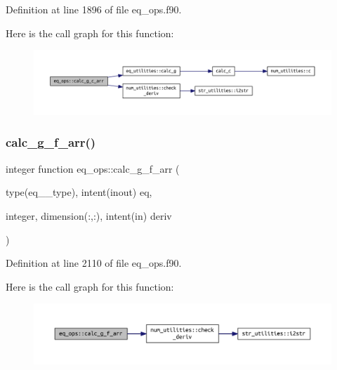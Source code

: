 Definition at line 1896 of file eq\+\_\+ops.\+f90.

Here is the call graph for this function\+:
\nopagebreak
\begin{figure}[H]
\begin{center}
\leavevmode
\includegraphics[width=350pt]{namespaceeq__ops_a7f4a16387d43c37a1dfa78eb4f91d4e4_cgraph}
\end{center}
\end{figure}
\mbox{\label{namespaceeq__ops_a29e2bd79210505601bdb37566a503e2a}} 
\subsubsection{\texorpdfstring{calc\+\_\+g\+\_\+f\+\_\+arr()}{calc\_g\_f\_arr()}}
{\footnotesize\ttfamily integer function eq\+\_\+ops\+::calc\+\_\+g\+\_\+f\+\_\+arr (\begin{DoxyParamCaption}\item[{type(eq\+\_\+2\+\_\+type), intent(inout)}]{eq,  }\item[{integer, dimension(\+:,\+:), intent(in)}]{deriv }\end{DoxyParamCaption})}



Definition at line 2110 of file eq\+\_\+ops.\+f90.

Here is the call graph for this function\+:
\nopagebreak
\begin{figure}[H]
\begin{center}
\leavevmode
\includegraphics[width=350pt]{namespaceeq__ops_a29e2bd79210505601bdb37566a503e2a_cgraph}
\end{center}
\end{figure}
\mbox{\label{namespaceeq__ops_acf8e40b36693a2c3cc778a85ef66bc32}} 
